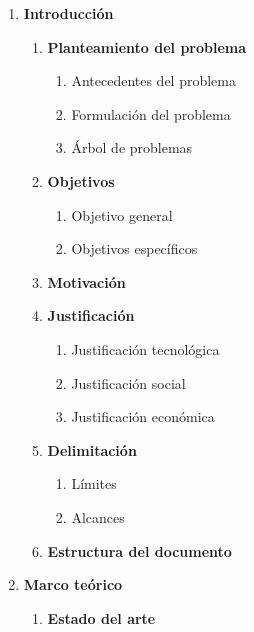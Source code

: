 \begin{enumerate}[label*=\arabic*.]

    \item \textbf{Introducción}
    \begin{enumerate}[label*=\arabic*.]
        \item \textbf{Planteamiento del problema}
        \begin{enumerate}[label*=\arabic*.]
            \item Antecedentes del problema
            \item Formulación del problema
            \item Árbol de problemas
        \end{enumerate}

        \item \textbf{Objetivos}
        \begin{enumerate}[label*=\arabic*.]
            \item Objetivo general
            \item Objetivos específicos
        \end{enumerate}

        \item \textbf{Motivación}

        \item \textbf{Justificación}
        \begin{enumerate}[label*=\arabic*.]
            \item Justificación tecnológica
            \item Justificación social
            \item Justificación económica
        \end{enumerate}

        \item \textbf{Delimitación}
        \begin{enumerate}[label*=\arabic*.]
            \item Límites
            \item Alcances
        \end{enumerate}

        \item \textbf{Estructura del documento}
    \end{enumerate}

    \item \textbf{Marco teórico}
    \begin{enumerate}[label*=\arabic*.]
        \item \textbf{Estado del arte}


\end{enumerate}
\end{enumerate}
